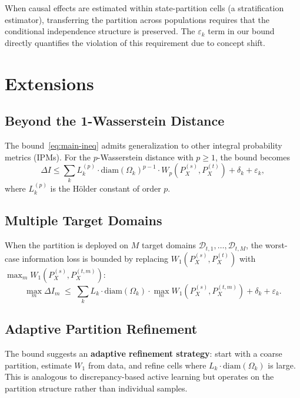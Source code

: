 \documentclass[12pt,a4paper]{article}
\newcommand{\cD}{\mathcal{D}}
\newcommand{\Wass}{W_1}
\newcommand{\diam}{\mathrm{diam}}
\begin{document}
When causal effects are estimated within state-partition cells
(a stratification estimator), transferring the partition across
populations requires that the conditional independence structure is
preserved.  The $\varepsilon_k$ term in our bound directly quantifies
the violation of this requirement due to concept shift.

\section{Extensions}

\subsection{Beyond the 1-Wasserstein Distance}

The bound~\eqref{eq:main-ineq} admits generalization to other integral
probability metrics (IPMs).  For the $p$-Wasserstein distance with
$p\geq1$, the bound becomes
\begin{equation}\label{eq:p-wasserstein}
    \Delta I \leq \sum_k L_k^{(p)}\cdot\diam(\Omega_k)^{p-1}\cdot
    W_p(P^{(s)}_X,P^{(t)}_X) + \delta_k + \varepsilon_k,
\end{equation}
where $L_k^{(p)}$ is the H\"older constant of order $p$.

\subsection{Multiple Target Domains}

When the partition is deployed on $M$ target domains
$\cD_{t,1},\dots,\cD_{t,M}$, the worst-case information loss is bounded by
replacing $\Wass(P^{(s)}_X,P^{(t)}_X)$ with
$\max_{m}\Wass(P^{(s)}_X,P^{(t,m)}_X)$:
\begin{equation}\label{eq:multi-target}
    \max_{m} \Delta I_m \;\leq\;
    \sum_k L_k\cdot\diam(\Omega_k)\cdot
    \max_{m}\Wass(P^{(s)}_X,P^{(t,m)}_X)
    + \delta_k + \varepsilon_k.
\end{equation}

\subsection{Adaptive Partition Refinement}

The bound suggests an \textbf{adaptive refinement strategy}: start with a
coarse partition, estimate $\Wass$ from data, and refine cells where
$L_k\cdot\diam(\Omega_k)$ is large.  This is analogous to
discrepancy-based active learning but operates on the partition structure
rather than individual samples.
\end{document}
